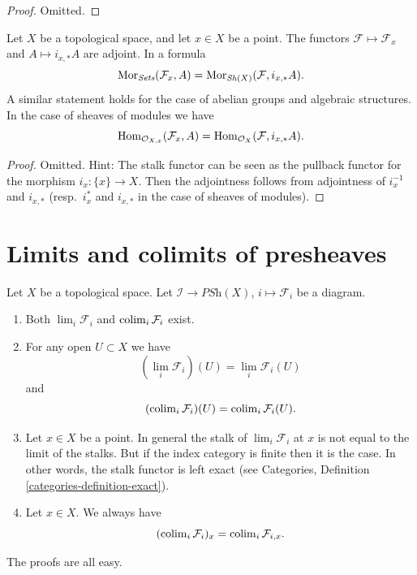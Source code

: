 \begin{proof}
Omitted.
\end{proof}

\begin{lemma}
\label{lemma-stalk-skyscraper-adjoint}
Let $X$ be a topological space, and let $x \in X$ be a point.
The functors $\mathcal{F} \mapsto \mathcal{F}_x$ and
$A \mapsto i_{x, *}A$ are adjoint. In a formula
$$
\mathop{\mathrm{Mor}}\nolimits_{\textit{Sets}}(\mathcal{F}_x, A)
=
\mathop{\mathrm{Mor}}\nolimits_{\mathop{\mathit{Sh}}\nolimits(X)}(\mathcal{F}, i_{x, *}A).
$$
A similar statement holds for the case of
abelian groups and algebraic structures. In the case of
sheaves of modules we have
$$
\mathop{\mathrm{Hom}}\nolimits_{\mathcal{O}_{X, x}}(\mathcal{F}_x, A)
=
\mathop{\mathrm{Hom}}\nolimits_{\mathcal{O}_X}(\mathcal{F}, i_{x, *}A).
$$
\end{lemma}

\begin{proof}
Omitted. Hint: The stalk functor can be
seen as the pullback functor for the morphism $i_x : \{x\} \to X$.
Then the adjointness follows from adjointness of
$i_x^{-1}$ and $i_{x, *}$ (resp.\ $i_x^*$ and $i_{x, *}$
in the case of sheaves of modules).
\end{proof}









\section{Limits and colimits of presheaves}
\label{section-limits-presheaves}

\noindent
Let $X$ be a topological space.
Let $\mathcal{I} \to \textit{PSh}(X)$, $i \mapsto \mathcal{F}_i$
be a diagram.
\begin{enumerate}
\item Both $\lim_i \mathcal{F}_i$ and $\mathop{\mathrm{colim}}\nolimits_i \mathcal{F}_i$
exist.
\item For any open $U \subset X$ we have
$$
(\lim_i \mathcal{F}_i)(U) =
\lim_i \mathcal{F}_i(U)
$$
and
$$
(\mathop{\mathrm{colim}}\nolimits_i \mathcal{F}_i)(U) =
\mathop{\mathrm{colim}}\nolimits_i \mathcal{F}_i(U).
$$
\item Let $x \in X$ be a point. In general the stalk of
$\lim_i \mathcal{F}_i$ at $x$ is not equal to
the limit of the stalks. But if the index category is finite
then it is the case. In other words, the stalk functor is
left exact (see Categories, Definition \ref{categories-definition-exact}).
\item Let $x \in X$. We always have
$$
(\mathop{\mathrm{colim}}\nolimits_i \mathcal{F}_i)_x =
\mathop{\mathrm{colim}}\nolimits_i \mathcal{F}_{i, x}.
$$
\end{enumerate}
The proofs are all easy.

